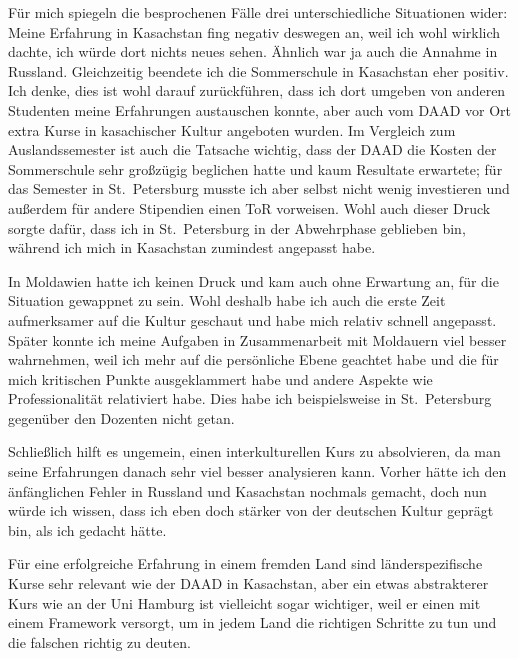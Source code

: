 \documentclass{../../sem_paper}
\begin{document}
Für mich spiegeln die besprochenen Fälle drei unterschiedliche Situationen wider: Meine Erfahrung in Kasachstan fing negativ deswegen an, weil ich wohl wirklich dachte, ich würde dort nichts neues sehen. Ähnlich war ja auch die Annahme in Russland. Gleichzeitig beendete ich die Sommerschule in Kasachstan eher positiv. Ich denke, dies ist wohl darauf zurückführen, dass ich dort umgeben von anderen Studenten meine Erfahrungen austauschen konnte, aber auch vom DAAD vor Ort extra Kurse in kasachischer Kultur angeboten wurden. Im Vergleich zum Auslandssemester ist auch die Tatsache wichtig, dass der DAAD die Kosten der Sommerschule sehr großzügig beglichen hatte und kaum Resultate erwartete; für das Semester in St.\ Petersburg musste ich aber selbst nicht wenig investieren und außerdem für andere Stipendien einen ToR vorweisen. Wohl auch dieser Druck sorgte dafür, dass ich in St.\ Petersburg in der Abwehrphase geblieben bin, während ich mich in Kasachstan zumindest angepasst habe.

In Moldawien hatte ich keinen Druck und kam auch ohne Erwartung an, für die Situation gewappnet zu sein. Wohl deshalb habe ich auch die erste Zeit aufmerksamer auf die Kultur geschaut und habe mich relativ schnell angepasst. Später konnte ich meine Aufgaben in Zusammenarbeit mit Moldauern viel besser wahrnehmen, weil ich mehr auf die persönliche Ebene geachtet habe und die für mich kritischen Punkte ausgeklammert habe und andere Aspekte wie Professionalität relativiert habe. Dies habe ich beispielsweise in St.\ Petersburg gegenüber den Dozenten nicht getan.

Schließlich hilft es ungemein, einen interkulturellen Kurs zu absolvieren, da man seine Erfahrungen danach sehr viel besser analysieren kann. Vorher hätte ich den änfänglichen Fehler in Russland und Kasachstan nochmals gemacht, doch nun würde ich wissen, dass ich eben doch stärker von der deutschen Kultur geprägt bin, als ich gedacht hätte. 

Für eine erfolgreiche Erfahrung in einem fremden Land sind länderspezifische Kurse sehr relevant wie der DAAD in Kasachstan, aber ein etwas abstrakterer Kurs wie an der Uni Hamburg ist vielleicht sogar wichtiger, weil er einen mit einem Framework versorgt, um in jedem Land die richtigen Schritte zu tun und die falschen richtig zu deuten.
\end{document}
